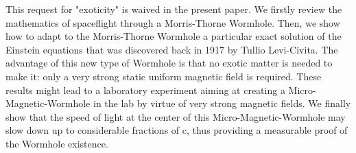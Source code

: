 This request for "exoticity" is waived in the present paper. We firstly review the mathematics of
spaceflight through a Morris-Thorne Wormhole. Then, we show how to adapt to the
Morris-Thorne Wormhole a particular exact solution of the Einstein equations that was
discovered back in 1917 by Tullio Levi-Civita. The advantage of this new type of Wormhole is
that no exotic matter is needed to make it: only a very strong static uniform magnetic field is
required. These results might lead to a laboratory experiment aiming at creating a
Micro-Magnetic-Wormhole in the lab by virtue of very strong magnetic fields. We finally show
that the speed of light at the center of this Micro-Magnetic-Wormhole may slow down up to
considerable fractions of c, thus providing a measurable proof of the Wormhole existence. 

